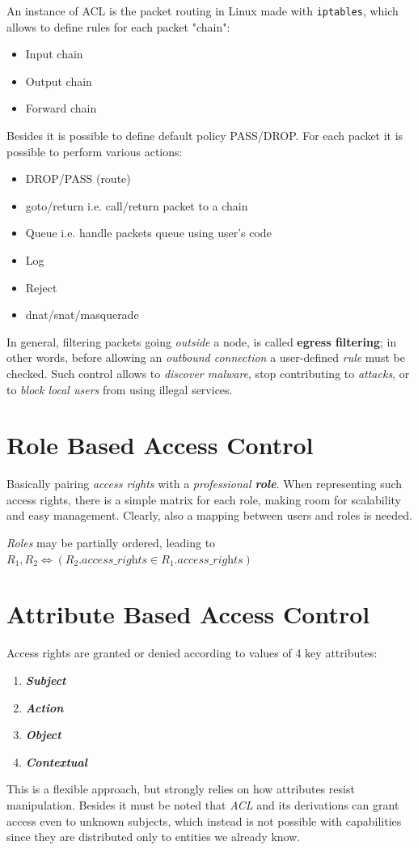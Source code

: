 An instance of ACL is the packet routing in Linux made with \texttt{iptables},
which allows to define rules for each packet "chain":
\begin{itemize}
    \item Input chain
    \item Output chain
    \item Forward chain
\end{itemize}
Besides it is possible to define default policy PASS/DROP.
For each packet it is possible to perform various actions:
\begin{itemize}
    \item DROP/PASS (route)
    \item goto/return i.e. call/return packet to a chain
    \item Queue i.e. handle packets queue using user's code
    \item Log
    \item Reject
    \item dnat/snat/masquerade
\end{itemize} 

In general, filtering packets going \textit{outside} a node, is called \textbf{egress filtering};
in other words, before allowing an \textit{outbound connection} a user-defined \textit{rule} must be checked.
Such control allows to \textit{discover malware}, stop contributing to \textit{attacks}, or to \textit{block local users} from using illegal services.

\section{Role Based Access Control}
Basically pairing \textit{access rights} with a \textit{professional \textbf{role}}.
When representing such access rights, there is a simple matrix for each role, making room for scalability and easy management.
Clearly, also a mapping between users and roles is needed.

\textit{Roles} may be partially ordered, leading to $R_1,R_2 \Leftrightarrow (R_2.\textit{access\_rights} \in R_1.\textit{access\_rights})$

\section{Attribute Based Access Control}
Access rights are granted or denied according to values of 4 key attributes:
\begin{enumerate}
    \item \textit{\textbf{Subject}}
    \item \textit{\textbf{Action}}
    \item \textit{\textbf{Object}}
    \item \textit{\textbf{Contextual}}
\end{enumerate}

This is a flexible approach, but strongly relies on how attributes resist manipulation.
Besides it must be noted that \textit{ACL} and its derivations can grant access even to unknown subjects,
which instead is not possible with capabilities since they are distributed only to entities we already know.
